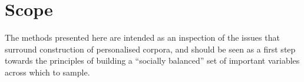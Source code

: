 % 
% 
% 








% 
% 




\section{Scope}
The methods presented here are intended as an inspection of the issues that surround construction of personalised corpora, and should be seen as a first step towards the principles of building a ``socially balanced'' set of important variables across which to sample.  















